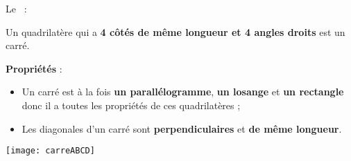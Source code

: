 \begin{definition}
Le  :

Un quadrilatère qui a \textcolor{C2}{\textbf{4 côtés de même longueur et 4 angles droits}} est un carré. \\[-3em]
\begin{minipage}[t]{0.7\linewidth}
\textcolor{H1}{\textbf{Propriétés}} :
\begin{itemize}
 \item Un carré est à la fois \textcolor{H1}{\textbf{un parallélogramme}}, \textcolor{H1}{\textbf{un losange}} et \textcolor{H1}{\textbf{un rectangle}} donc il a toutes les propriétés de ces quadrilatères ;
 \item Les diagonales d'un carré sont \textcolor{H1}{\textbf{perpendiculaires}} et \textcolor{H1}{\textbf{de même longueur}}.
 \end{itemize}
 \end{minipage}
 \begin{minipage}[c]{0.18\linewidth}
 \vspace{1cm}
  \texttt{[image: carreABCD]}
  \end{minipage} \\
\end{definition}
